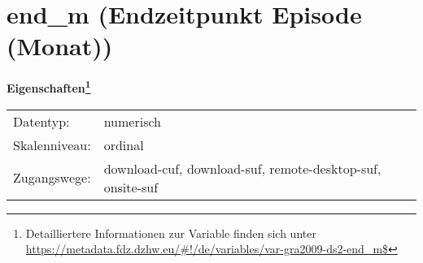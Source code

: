 
    \setcounter{footnote}{0}

    \vspace*{-1.8cm}
	\section{end\_m (Endzeitpunkt Episode (Monat))}
	\label{section:end_m}



    \vspace*{0.5cm}
    \noindent\textbf{Eigenschaften\footnote{Detailliertere Informationen zur Variable finden sich unter
		\url{https://metadata.fdz.dzhw.eu/\#!/de/variables/var-gra2009-ds2-end_m$}}}\\
	\begin{tabularx}{\hsize}{@{}lX}
	Datentyp: & numerisch \\
	Skalenniveau: & ordinal \\
	Zugangswege: &
	  download-cuf, 
	  download-suf, 
	  remote-desktop-suf, 
	  onsite-suf
 \\
    \end{tabularx}



